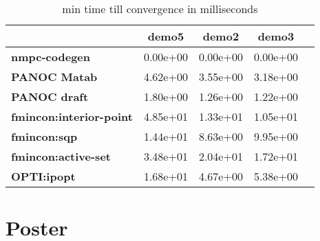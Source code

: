 \begin{table}[H]
	\centering
	\begin{tabular}{|l|	c|c|c|c|}
		\hline
		&\textbf{demo5}&\textbf{demo2}&\textbf{demo3}\\\hline
		\textbf{nmpc-codegen}&0.00e+00&0.00e+00&0.00e+00\\\hline
		\textbf{PANOC Matab}&4.62e+00&3.55e+00&3.18e+00\\\hline
		\textbf{PANOC draft}&1.80e+00&1.26e+00&1.22e+00\\\hline
		\textbf{fmincon:interior-point}&4.85e+01&1.33e+01&1.05e+01\\\hline
		\textbf{fmincon:sqp}&1.44e+01&8.63e+00&9.95e+00\\\hline
		\textbf{fmincon:active-set}&3.48e+01&2.04e+01&1.72e+01\\\hline
		\textbf{OPTI:ipopt}&1.68e+01&4.67e+00&5.38e+00\\\hline
	\end{tabular}
	\caption{min time till convergence in milliseconds}
	\label{tbl:min time till convergence with noise}
\end{table}

\chapter{Poster}

